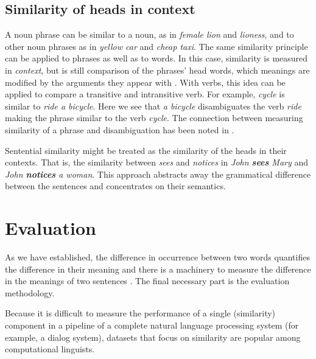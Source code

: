 \subsection{Similarity of heads in context}
\label{sec:similarity-context}

A noun phrase can be similar to a noun, as in \textit{female lion} and \textit{lioness}, and to other noun phrases as in \textit{yellow car} and \textit{cheap taxi}. The same similarity principle can be applied to phrases as well as to words. In this case, similarity is measured in \emph{context}, but is still comparison of the phrases' head words, which meanings are modified by the arguments they appear with \cite{Kintsch2001173,mitchell-lapata:2008:ACLMain,mitchell2010composition,Dinu:2010:MDS:1870658.1870771,Baroni2010nouns,thater-furstenau-pinkal:2011:IJCNLP-2011,Seaghdha:2011:PMS:2145432.2145545}. With verbs, this idea can be applied to compare a transitive and intransitive verb. For example, \textit{cycle} is similar to \textit{ride a bicycle}. Here we see that \textit{a bicycle} disambiguates the verb \textit{ride} making the phrase similar to the verb \textit{cycle}. The connection between measuring similarity of a phrase and disambiguation has been noted in .


Sentential similarity might be treated as the similarity of the heads in their contexts. That is, the similarity between \textit{sees} and \textit{notices} in \textit{John \textbf{sees} Mary} and \textit{John \textbf{notices} a woman}. This approach abstracts away the grammatical difference between the sentences and concentrates on their semantics.

\section{Evaluation}
\label{sec:intrinsic-evaluation}

As we have established, the difference in occurrence between two words quantifies the difference in their meaning \cite{harris1954distributional} and there is a machinery to measure the difference in the meanings of two sentences \cite{DBLP:journals/corr/abs-1003-4394}. The final necessary part is the evaluation methodology.

Because it is difficult to measure the performance of a single (similarity) component in a pipeline of a complete natural language processing system (for example, a dialog system), datasets that focus on similarity are popular among computational linguists.

